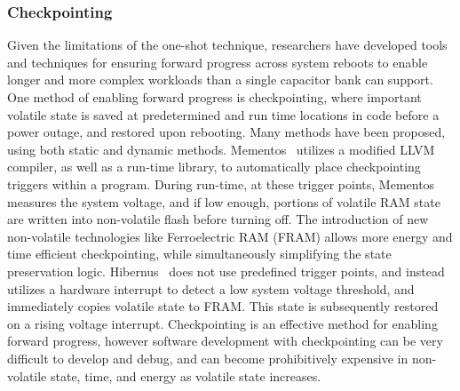 \subsubsection{Checkpointing}
Given the limitations of the one-shot technique, researchers have developed tools and techniques for 
ensuring forward progress across system reboots to enable longer and more complex workloads than a single capacitor bank can support.
One method of enabling forward progress is checkpointing,
where important volatile state is saved at predetermined and run time locations in code before a power outage, and restored upon rebooting. Many methods have been proposed, using both static and dynamic methods.
Mementos~\cite{ransford2012mementos} utilizes a modified LLVM compiler, as well as a run-time library, to automatically place checkpointing triggers within a program. During run-time, at these trigger points, Mementos measures the system voltage, and if low enough, portions of volatile RAM state are written into non-volatile flash before turning off.
The introduction of new non-volatile technologies like Ferroelectric RAM (FRAM) allows more energy and time efficient checkpointing, while simultaneously simplifying the state preservation logic.
Hibernus~\cite{balsamo2014hibernus} does not use predefined trigger points, and instead utilizes a hardware interrupt to detect a low system voltage threshold, and immediately copies volatile state to FRAM. This state is subsequently restored on a rising voltage interrupt.
Checkpointing is an effective method for enabling forward progress, however software development with checkpointing can be very difficult to develop and debug, and can become prohibitively expensive in non-volatile state, time, and energy as volatile state increases. 

